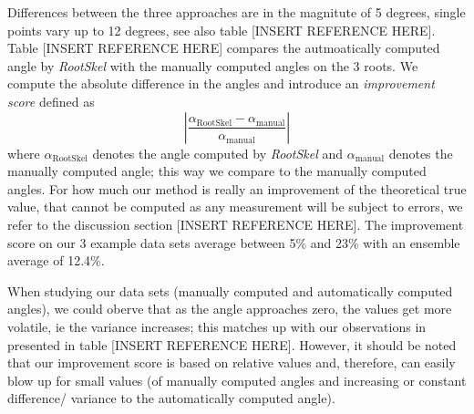 Differences between the three approaches are in the magnitute of 5 degrees, single points vary up to 12 degrees, see also table [INSERT REFERENCE HERE].
Table [INSERT REFERENCE HERE] compares the autmoatically computed angle by \textit{RootSkel} with the manually computed angles on the 3 roots. We compute the absolute difference in the angles and introduce an \textit{improvement score} defined as 
\[
| \frac{ \alpha_{\text{RootSkel}} - \alpha_{\text{manual}} }{\alpha_{\text{manual}}} |
\]
where $\alpha_{\text{RootSkel}}$ denotes the angle computed by \textit{RootSkel} and $\alpha_{\text{manual}}$ denotes the manually computed angle; this way we compare to the manually computed angles. For how much our method is really an improvement of the theoretical true value, that cannot be computed as any measurement will be subject to errors, we refer to the discussion section [INSERT REFERENCE HERE]. The improvement score on our 3 example data sets average between 5\% and 23\% with an ensemble average of 12.4\%.

When studying our data sets (manually computed and automatically computed angles), we could oberve that as the angle approaches zero, the values get more volatile, ie the variance increases; this matches up with our observations in presented in table [INSERT REFERENCE HERE]. However, it should be noted that our improvement score is based on relative values and, therefore, can easily blow up for small values (of manually computed angles and increasing or constant difference/ variance to the automatically computed angle).



